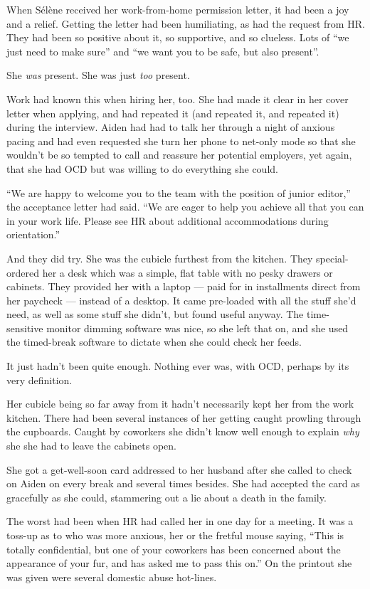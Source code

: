 When Sélène received her work-from-home permission letter, it had been a joy and a relief. Getting the letter had been humiliating, as had the request from HR. They had been so positive about it, so supportive, and so clueless. Lots of ``we just need to make sure'' and ``we want you to be safe, but also present''.

She \emph{was} present. She was just \emph{too} present.

Work had known this when hiring her, too. She had made it clear in her cover letter when applying, and had repeated it (and repeated it, and repeated it) during the interview. Aiden had had to talk her through a night of anxious pacing and had even requested she turn her phone to net-only mode so that she wouldn't be so tempted to call and reassure her potential employers, yet again, that she had OCD but was willing to do everything she could.

``We are happy to welcome you to the team with the position of junior editor,'' the acceptance letter had said. ``We are eager to help you achieve all that you can in your work life. Please see HR about additional accommodations during orientation.''

And they did try. She was the cubicle furthest from the kitchen. They special-ordered her a desk which was a simple, flat table with no pesky drawers or cabinets. They provided her with a laptop --- paid for in installments direct from her paycheck --- instead of a desktop. It came pre-loaded with all the stuff she'd need, as well as some stuff she didn't, but found useful anyway. The time-sensitive monitor dimming software was nice, so she left that on, and she used the timed-break software to dictate when she could check her feeds.

It just hadn't been quite enough. Nothing ever was, with OCD, perhaps by its very definition.

Her cubicle being so far away from it hadn't necessarily kept her from the work kitchen. There had been several instances of her getting caught prowling through the cupboards. Caught by coworkers she didn't know well enough to explain \emph{why} she she had to leave the cabinets open.

She got a get-well-soon card addressed to her husband after she called to check on Aiden on every break and several times besides. She had accepted the card as gracefully as she could, stammering out a lie about a death in the family.

The worst had been when HR had called her in one day for a meeting. It was a toss-up as to who was more anxious, her or the fretful mouse saying, ``This is totally confidential, but one of your coworkers has been concerned about the appearance of your fur, and has asked me to pass this on.'' On the printout she was given were several domestic abuse hot-lines.

